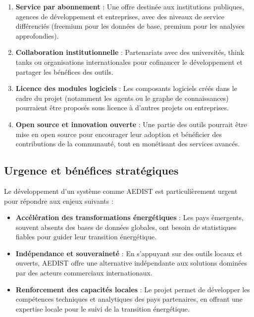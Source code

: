 \documentclass[a4paper,11pt]{report}
\providecommand{\tightlist}{\setlength{\itemsep}{0pt}\setlength{\parskip}{0pt}}
\begin{document}
\begin{enumerate}
\def\labelenumi{\arabic{enumi}.}
\tightlist
\item
  \textbf{Service par abonnement} : Une offre destinée aux institutions publiques, agences de développement et entreprises, avec des niveaux de service différenciés (freemium pour les données de base, premium pour les analyses approfondies).
\item
  \textbf{Collaboration institutionnelle} : Partenariats avec des universités, think tanks ou organisations internationales pour cofinancer le développement et partager les bénéfices des outils.
\item
  \textbf{Licence des modules logiciels} : Les composants logiciels créés dans le cadre du projet (notamment les agents ou le graphe de connaissances) pourraient être proposés sous licence à d'autres projets ou entreprises.
\item
  \textbf{Open source et innovation ouverte} : Une partie des outils pourrait être mise en open source pour encourager leur adoption et bénéficier des contributions de la communauté, tout en monétisant des services avancés.
\end{enumerate}

\subsection{Urgence et bénéfices stratégiques}\label{urgence-et-buxe9nuxe9fices-stratuxe9giques}

Le développement d'un système comme AEDIST est particulièrement urgent pour répondre aux enjeux suivants :

\begin{itemize}
\tightlist
\item
  \textbf{Accélération des transformations énergétiques} : Les pays émergents, souvent absents des bases de données globales, ont besoin de statistiques fiables pour guider leur transition énergétique.
\item
  \textbf{Indépendance et souveraineté} : En s'appuyant sur des outils locaux et ouverts, AEDIST offre une alternative indépendante aux solutions dominées par des acteurs commerciaux internationaux.
\item
  \textbf{Renforcement des capacités locales} : Le projet permet de développer les compétences techniques et analytiques des pays partenaires, en offrant une expertise locale pour le suivi de la transition énergétique.
\end{itemize}
\end{document}
